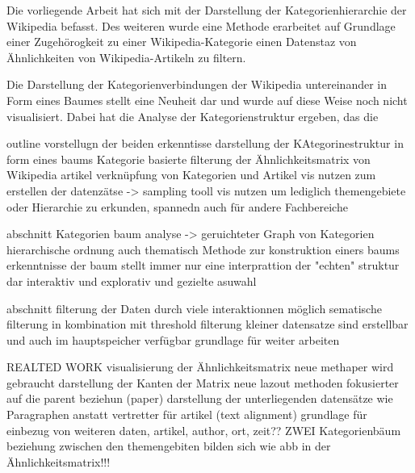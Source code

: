 
Die vorliegende Arbeit hat sich mit der Darstellung der Kategorienhierarchie der Wikipedia befasst.
Des weiteren wurde eine Methode erarbeitet auf Grundlage einer Zugehörogkeit zu einer Wikipedia-Kategorie einen Datenstaz von Ähnlichkeiten von Wikipedia-Artikeln zu filtern.

Die Darstellung der Kategorienverbindungen der Wikipedia untereinander in Form eines Baumes stellt eine Neuheit dar und wurde auf diese Weise noch nicht visualisiert.
Dabei hat die Analyse der Kategorienstruktur ergeben, das die 


outline
vorstellugn der beiden erkenntisse
    darstellung der KAtegorinestruktur in form eines baums
    Kategorie basierte filterung der Ähnlichkeitsmatrix von Wikipedia artikel
    verknüpfung von Kategorien und Artikel
vis nutzen zum erstellen der datenzätse -> sampling tooll
vis nutzen um lediglich themengebiete oder Hierarchie zu erkunden, spannedn auch für andere Fachbereiche
    
abschnitt Kategorien baum
    analyse -> geruichteter Graph von Kategorien
    hierarchische ordnung auch thematisch
    Methode zur konstruktion einers baums
    erkenntnisse der baum stellt immer nur eine interprattion der "echten" struktur dar
    interaktiv und explorativ und gezielte asuwahl
    
    
abschnitt
    filterung der Daten durch viele interaktionnen möglich
    sematische filterung in kombination mit threshold filterung
    kleiner datensatze sind erstellbar und auch im hauptspeicher verfügbar
    grundlage für weiter arbeiten 

REALTED WORK
    visualisierung der Ähnlichkeitsmatrix neue methaper wird gebraucht
    darstellung der Kanten der Matrix
    neue lazout methoden fokusierter auf die parent beziehun (paper)
    darstellung der unterliegenden datensätze wie Paragraphen anstatt vertretter für artikel (text alignment)
    grundlage für einbezug von weiteren daten, artikel, author, ort, zeit??
    ZWEI Kategorienbäum beziehung zwischen den themengebiten bilden sich wie abb in der Ähnlichkeitsmatrix!!!

